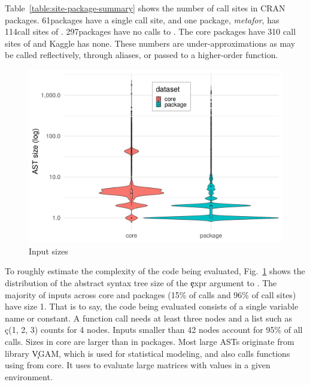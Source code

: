 \documentclass[conference]{IEEEtran}
\newcommand{\NbAstOnePercent}{15\%\xspace}
\newcommand{\NbAstOneCallSitePercent}{96\%\xspace}
\newcommand{\AstSizeNineFive}{42\xspace}
\newcommand{\NbCoreEvalCallSites}{310\xspace}
\newcommand{\MaxCallSitesEnrich}{114}
\newcommand{\OneCallSitesEnrich}{61}
\newcommand{\NoCallSitesEnrich}{297}
\begin{document}
Table~\ref{table:site-package-summary} shows the number of call sites in
CRAN packages. \OneCallSitesEnrich packages have a single call site, and one
package, \emph{metafor}, has \MaxCallSitesEnrich call sites of
\eval. \NoCallSitesEnrich packages have no calls to \eval. The core packages
have \NbCoreEvalCallSites call sites of \eval and Kaggle has none. These
numbers are under-approximations as \eval may be called reflectively,
through aliases, or passed to a higher-order function.

\begin{table}[ht]
\caption{Distribution of callsites in CRAN}
\label{table:site-package-summary}
\end{table}

\begin{figure}[!b]
	\centering
\includegraphics[width=\columnwidth]{ast_sizes}
\caption{Input sizes} \label{fig:ast-size}
\end{figure}

To roughly estimate the complexity of the code being evaluated,
Fig.~\ref{fig:ast-size} shows the distribution of the abstract syntax tree
size of the \c{expr} argument to \eval. The majority of inputs across core
and packages (\NbAstOnePercent of \eval calls and \NbAstOneCallSitePercent
of call sites) have size 1. That is to say, the code being evaluated
consists of a single variable name or constant. A function call needs at
least three nodes and a list such as \c{c(1, 2, 3)} counts for 4
nodes. Inputs smaller than \AstSizeNineFive nodes account for 95\% of all
calls. Sizes in core are larger than in packages. Most large ASTs originate
from library \c{VGAM}, which is used for statistical modeling, and also calls functions using \eval from core. It uses
\eval to evaluate large matrices with values in a given environment.
\end{document}
